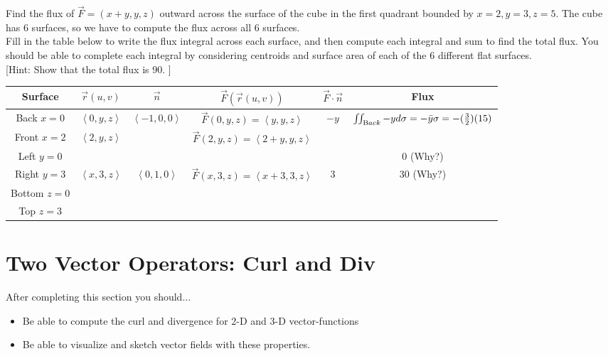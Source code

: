 \begin{problem}\label{boxflux} 

Find the flux of $ \vec F=(x+y,y,z) $ outward across the surface of the cube in the first quadrant bounded by {$ x=2,y=3,z=5 $}. The cube has 6 surfaces, so we have to compute the flux across all 6 surfaces. \\

Fill in the table below to write the flux integral across each surface, and then compute each integral and sum to find the total flux. You should be able to complete each integral by considering centroids and surface area of each of the 6 different flat surfaces. \\

[Hint: Show that the total flux is 90. ]
\begin{center}
\begin{tabular}{|c|c|c|c|c|c|}
\hline
Surface&$\vec r(u,v)$ & $\vec n$ & $\vec F(\vec r(u,v))$ & $\vec F\cdot \vec n$  & Flux\\\hline
Back $x=0$&$ \left<0,y,z\right>$   & $ \left<-1,0,0\right>$ & $\vec F(0,y,z) = \left<y,y,z\right>$ & $-y$&  $\iint_{\text Back} -y d\sigma = -\bar y \sigma=-(\frac{3}{2})(15)$\\\hline
Front $x=2$& $ \left<2,y,z\right>$ &  & $\vec F(2,y,z) = \left<2+y,y,z\right>$ &  & \\\hline
Left $y=0$&     & &  & &  $0$ (Why?)\\\hline
Right $y=3$&   $ \left<x,3,z\right>$      & $ \left<0,1,0\right>$  & $\vec F(x,3,z) = \left<x+3,3,z\right>$ & 3 & 30 (Why?) \\\hline
Bottom $z=0$&     & &  & & \\\hline
Top $z=3$&    & &  & & \\\hline
\end{tabular} 
\end{center}

\end{problem}


\section{Two Vector Operators: Curl and Div}
After completing this section you should...
\begin{itemize}
\item Be able to compute the curl and divergence for 2-D and 3-D vector-functions
\item Be able to visualize and sketch vector fields with these properties.
\end{itemize}

